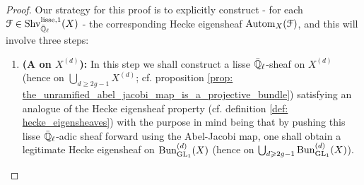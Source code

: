         \begin{proof}
            Our strategy for this proof is to explicitly construct - for each $\mathcal{F} \in \mathrm{Shv}_{\bar{\mathbb{Q}}_{\ell}}^{\mathrm{lisse}, 1}(X)$ - the corresponding Hecke eigensheaf $\mathrm{Autom}_X(\mathcal{F})$, and this will involve three steps:
                \begin{enumerate}
                    \item \textbf{(A  on $X^{(d)}$):} In this step we shall construct a lisse $\bar{\mathbb{Q}}_{\ell}$-sheaf on $X^{(d)}$ (hence on $\bigcup_{d \geq 2g - 1} X^{(d)}$; cf. proposition \ref{prop: the_unramified_abel_jacobi_map_is_a_projective_bundle}) satisfying an analogue of the Hecke eigensheaf property (cf. definition \ref{def: hecke_eigensheaves}) with the purpose in mind being that by pushing this lisse $\bar{\mathbb{Q}}_{\ell}$-adic sheaf forward using the Abel-Jacobi map, one shall obtain a legitimate Hecke eigensheaf on $\mathrm{Bun}_{\operatorname{GL}_1}^{(d)}(X)$ (hence on $\bigcup_{d \geqslant 2g - 1} \mathrm{Bun}_{\operatorname{GL}_1}^{(d)}(X)$).
                    

\end{enumerate}
\end{proof}
